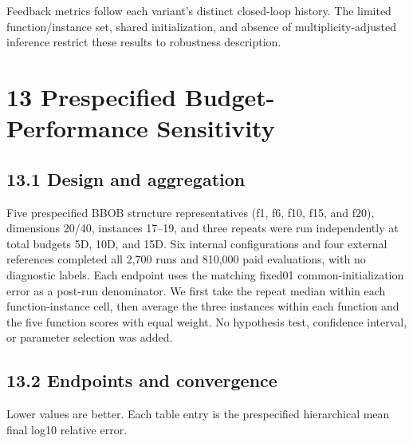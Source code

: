 \documentclass[11pt,a4paper]{article}
\begin{document}
Feedback metrics follow each variant's distinct closed-loop history. The
limited function/instance set, shared initialization, and absence of
multiplicity-adjusted inference restrict these results to robustness
description.

\hypertarget{prespecified-budget-performance-sensitivity}{%
\section{13 Prespecified Budget-Performance
Sensitivity}\label{prespecified-budget-performance-sensitivity}}

\hypertarget{design-and-aggregation}{%
\subsection{13.1 Design and aggregation}\label{design-and-aggregation}}

Five prespecified BBOB structure representatives (f1, f6, f10, f15, and
f20), dimensions 20/40, instances 17--19, and three repeats were run
independently at total budgets 5D, 10D, and 15D. Six internal
configurations and four external references completed all 2,700 runs and
810,000 paid evaluations, with no diagnostic labels. Each endpoint uses
the matching fixed01 common-initialization error as a post-run
denominator. We first take the repeat median within each
function-instance cell, then average the three instances within each
function and the five function scores with equal weight. No hypothesis
test, confidence interval, or parameter selection was added.

\hypertarget{endpoints-and-convergence-1}{%
\subsection{13.2 Endpoints and
convergence}\label{endpoints-and-convergence-1}}

Lower values are better. Each table entry is the prespecified
hierarchical mean final log10 relative error.
\end{document}
